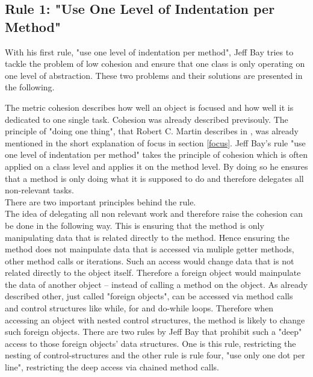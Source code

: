 \subsection*{Rule 1: "Use One Level of Indentation per Method"}
\label{describe:rule1}
With his first rule, "use one level of indentation per method", Jeff Bay tries to tackle the problem of low cohesion and ensure that one class is only operating on one level of abstraction. These two problems and their solutions are presented in the following. 

The metric cohesion describes how well an object is focused and how well it is dedicated to one single task. Cohesion was already described previsouly. The principle of "doing one thing", that Robert C. Martin describes in \cite{cc}, was already mentioned in the short explanation of focus in section \ref{focus}. Jeff Bay's rule  "use one level of indentation per method" takes the principle of cohesion which is often applied on a class level and applies it on the method level. By doing so he ensures that a method is only doing what it is supposed to do and therefore delegates all non-relevant tasks. \\

There are two important principles behind the rule.
\\

The idea of delegating all non relevant work and therefore raise the cohesion can be done in the following way.
This is ensuring that the method is only manipulating data that is related directly to the method. Hence ensuring the method does not mainpulate data that is accessed via muliple getter methods, other method calls or iterations. Such an access would change data that is not related directly to the object itself. Therefore a foreign object would mainpulate the data of another object -- instead of calling a method on the object. As already described other, just called "foreign objects", can be accessed via method calls and control structures like while, for and do-while loops. Therefore when accessing an object with nested control structures, the method is likely to change such foreign objects. There are two rules by Jeff Bay that prohibit such a "deep" access to those foreign objects' data structures. One is this rule, restricting the nesting of control-structures and the other rule is rule four, "use only one dot per line", restricting the deep access via chained method calls. \\

